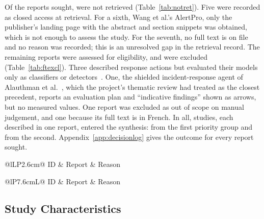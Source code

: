 

Of the \NSought{} reports sought, \NNotRetrieved{} were not retrieved (Table~\ref{tab:notret}). Five were recorded as closed access at retrieval. For a sixth, Wang et al.'s AlertPro, only the publisher's landing page with the abstract and section snippets was obtained, which is not enough to assess the study. For the seventh, no full text is on file and no reason was recorded; this is an unresolved gap in the retrieval record. The remaining \NAssessed{} reports were assessed for eligibility, and \NExclFT{} were excluded (Table~\ref{tab:ftexcl}). Three described response actions but evaluated their models only as classifiers or detectors~\cite{manojkumar2026,bompally2026,reddyavula2026}. One, the shielded incident-response agent of Alauthman et al.~\cite{alauthman2026}, which the project's thematic review had treated as the closest precedent, reports an evaluation plan and ``indicative findings'' shown as arrows, but no measured values. One report was excluded as out of scope on manual judgement, and one because its full text is in French. In all, \NIncluded{} studies, each described in one report, entered the synthesis: \NInclPOne{} from the first priority group and \NInclPTwo{} from the second. Appendix~\ref{app:decisionlog} gives the outcome for every report sought.

\begin{table}[!t]
\centering
\caption{Reports Not Retrieved}
\label{tab:notret}
\footnotesize
\begin{tabularx}{\columnwidth}{@{}lLP{2.6cm}@{}}
\toprule
ID & Report & Reason \\
\midrule
{}
\bottomrule
\end{tabularx}
\end{table}

\begin{table}[!t]
\centering
\caption{Reports Excluded at Full-Text Assessment}
\label{tab:ftexcl}
\footnotesize
\begin{tabularx}{\textwidth}{@{}lP{7.6cm}L@{}}
\toprule
ID & Report & Reason \\
\midrule
{}
\bottomrule
\end{tabularx}
\end{table}

\subsection{Study Characteristics}

